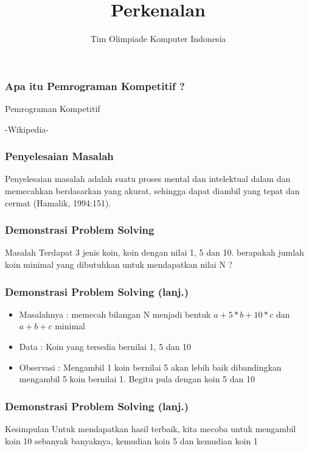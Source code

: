 

\title{Perkenalan}
\author{Tim Olimpiade Komputer Indonesia}
\date{}



\begin{frame}
\titlepage
\end{frame}

\begin{frame}
\frametitle{Apa itu Pemrograman Kompetitif ?}
\begin{block}{Pemrograman Kompetitif}

-Wikipedia-
\end{block}
\end{frame}

\begin{frame}
\frametitle{Penyelesaian Masalah}
Penyelesaian masalah adalah suatu proses mental dan intelektual dalam  dan memecahkan berdasarkan  yang akurat, sehingga dapat diambil  yang tepat dan cermat (Hamalik, 1994:151).
\end{frame}

\begin{frame}
\frametitle{Demonstrasi Problem Solving}
\begin{block}{Masalah}
Terdapat 3 jenis koin, koin dengan nilai 1, 5 dan 10.
berapakah jumlah koin minimal yang dibutuhkan untuk mendapatkan nilai N ?
\end{block}
\end{frame}

\begin{frame}
\frametitle{Demonstrasi Problem Solving (lanj.)}
\begin{itemize}
  \item Masalahnya : memecah bilangan N menjadi bentuk $a + 5 * b + 10 * c$ dan $a + b + c$ minimal
  \item Data : Koin yang tersedia bernilai 1, 5 dan 10
  \item Observasi : Mengambil 1 koin bernilai 5 akan lebih baik dibandingkan mengambil 5 koin bernilai 1. Begitu pula dengan koin 5 dan 10
\end{itemize}
\end{frame}

\begin{frame}
\frametitle{Demonstrasi Problem Solving (lanj.)}
\begin{block}{Kesimpulan}
Untuk mendapatkan hasil terbaik, kita mecoba untuk mengambil koin 10 sebanyak banyaknya, kemudian koin 5 dan kemudian koin 1
\end{block}
\end{frame}


